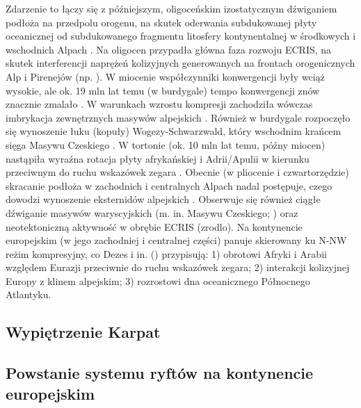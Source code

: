 \documentclass[11.5pt,twoside]{report}
\begin{document}
Zdarzenie to łączy się \parencite{Wilson.2006,Ceriani.2001} z pó\'{z}niejszym, oligoceńskim izostatycznym dźwiganiem podłoża na przedpolu orogenu, na skutek oderwania subdukowanej płyty oceanicznej od subdukowanego fragmentu litosfery kontynentalnej w środkowych i wschodnich Alpach \parencite{Sinclair.1997,vonBlackenburg.1995}. Na oligocen przypadła główna faza rozwoju ECRIS, na skutek interferencji naprężeń kolizyjnych generowanych na frontach orogenicznych Alp i Pirenejów (np. \cite{Dezes.2004}). W miocenie współczynniki konwergencji były wciąż wysokie, ale ok. 19 mln lat temu (w burdygale) tempo konwergencji znów znacznie zmalało \parencite{Sissingh.2006a}. W warunkach wzrostu kompresji zachodziła wówczas imbrykacja zewnętrznych masywów alpejskich \parencite{Dezes.2004}. Również w burdygale rozpoczęło się wynoszenie łuku (kopuły) Wogezy-Schwarzwald, który wschodnim krańcem sięga Masywu Czeskiego \parencite{Dezes.2004}. W tortonie (ok. 10 mln lat temu, pó\'{z}ny miocen) nastąpiła wyra\'{z}na rotacja płyty afrykańskiej i Adrii/Apulii w kierunku przeciwnym do ruchu wskazówek zegara \parencite{Sissingh.2006a}. Obecnie (w pliocenie i czwartorzędzie) skracanie podłoża w zachodnich i centralnych Alpach nadal postępuje, czego dowodzi wynoszenie eksternidów alpejskich \parencite{Dezes.2004}. Obserwuje się również ciągłe d\'{z}wiganie masywów waryscyjskich (m. in. Masywu Czeskiego; \cite{Dezes.2004}) oraz neotektoniczną aktywność w obrębie ECRIS (zrodlo). Na kontynencie europejskim (w jego zachodniej i centralnej części) panuje skierowany ku N-NW reżim kompresyjny, co Dezes i in. (\citeyear{Dezes.2004}) przypisują: 1) obrotowi Afryki i Arabii względem Eurazji przeciwnie do ruchu wskazówek zegara; 2) interakcji kolizyjnej Europy z klinem alpejskim; 3) rozrostowi dna oceanicznego Północnego Atlantyku.


	\subsection{Wypiętrzenie Karpat}
	
	
	\subsection{Powstanie systemu ryftów na kontynencie europejskim}
	
\end{document}
